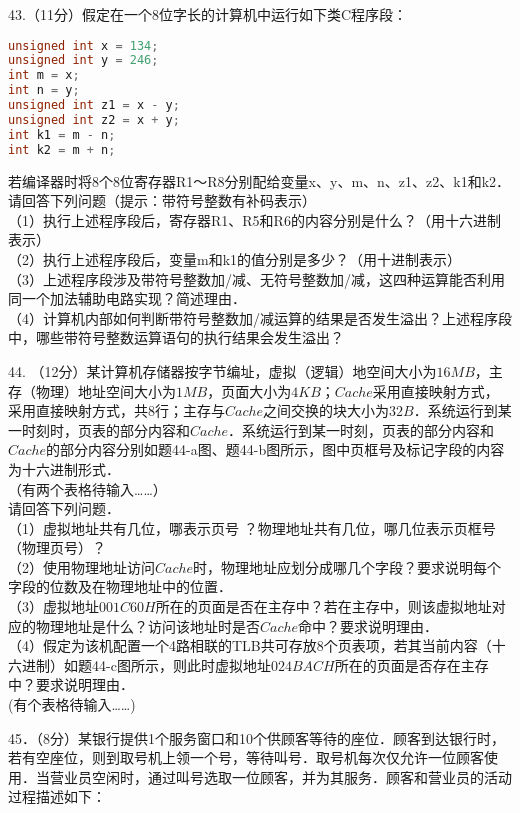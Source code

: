 43.（11分）假定在一个8位字长的计算机中运行如下类C程序段：
\begin{lstlisting}[language=cpp]
unsigned int x = 134;
unsigned int y = 246;
int m = x;
int n = y;
unsigned int z1 = x - y;
unsigned int z2 = x + y;
int k1 = m - n;
int k2 = m + n;
\end{lstlisting}
若编译器时将8个8位寄存器R1～R8分别配给变量x、y、m、n、z1、z2、k1和k2．请回答下列问题（提示：带符号整数有补码表示） \\
（1）执行上述程序段后，寄存器R1、R5和R6的内容分别是什么？（用十六进制表示） \\
（2）执行上述程序段后，变量m和k1的值分别是多少？（用十进制表示）  \\
（3）上述程序段涉及带符号整数加/减、无符号整数加/减，这四种运算能否利用同一个加法辅助电路实现？简述理由． \\
（4）计算机内部如何判断带符号整数加/减运算的结果是否发生溢出？上述程序段中，哪些带符号整数运算语句的执行结果会发生溢出？

44. （12分）某计算机存储器按字节编址，虚拟（逻辑）地空间大小为$16MB$，主存（物理）地址空间大小为$1MB$，页面大小为$4KB$；$Cache$采用直接映射方式，采用直接映射方式，共$8$行；主存与$Cache$之间交换的块大小为$32B$．系统运行到某一时刻时，页表的部分内容和$Cache$．系统运行到某一时刻，页表的部分内容和$Cache$的部分内容分别如题44-a图、题44-b图所示，图中页框号及标记字段的内容为十六进制形式．  \\
（有两个表格待输入……） \\
请回答下列问题． \\
（1）虚拟地址共有几位，哪表示页号 ？物理地址共有几位，哪几位表示页框号（物理页号）？ \\
（2）使用物理地址访问$Cache$时，物理地址应划分成哪几个字段？要求说明每个字段的位数及在物理地址中的位置． \\
（3）虚拟地址$001C60H$所在的页面是否在主存中？若在主存中，则该虚拟地址对应的物理地址是什么？访问该地址时是否$Cache$命中？要求说明理由． \\
（4）假定为该机配置一个4路相联的TLB共可存放8个页表项，若其当前内容（十六进制）如题44-c图所示，则此时虚拟地址$024BACH$所在的页面是否存在主存中？要求说明理由． \\
(有个表格待输入……)

45．（8分）某银行提供1个服务窗口和10个供顾客等待的座位．顾客到达银行时，若有空座位，则到取号机上领一个号，等待叫号．取号机每次仅允许一位顾客使用．当营业员空闲时，通过叫号选取一位顾客，并为其服务．顾客和营业员的活动过程描述如下：




